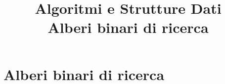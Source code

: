 

\usepackage[normalem]{ulem}
\usepackage{xcolor}
\usepackage{tikz}
\usetikzlibrary{trees}
\usetikzlibrary{shapes}
\usetikzlibrary{positioning}

\newcommand*\Ball[1]{\tikz[anchor=base,baseline=-1.5pt]{
            \node[circle,ball color=blue, shade, 
 color=white,inner sep=1.2pt] (char) {\tiny #1};}}


\newcommand*\circled[1]{\tikz[baseline=(char.base)]{
            \node[minimum width=0.6cm,shape=circle,draw,inner sep=2pt,font=\ttfamily\bfseries] (char) {\small #1};}}
\newcommand*\circledr[1]{\tikz[baseline=(char.base)]{
            \node[minimum width=0.6cm,shape=circle,draw,fill=red!30,inner sep=2pt,font=\ttfamily\bfseries] (char) {\small #1};}}
\newcommand*\circledb[1]{\tikz[baseline=(char.base)]{
            \node[minimum width=0.6cm,shape=circle,draw,fill=blue!30,inner sep=2pt,font=\ttfamily\bfseries] (char) {\small #1};}}
            
\usepackage{xmpmulti}
\usepackage{listings}








\title[ASD - Strutture dati]{\textbf{Algoritmi e Strutture Dati}\\[24pt]
Alberi binari di ricerca}

\graphicspath{{figs/06/}}








\FrameTitle{}

\FrameContent

\section{Alberi binari di ricerca}


